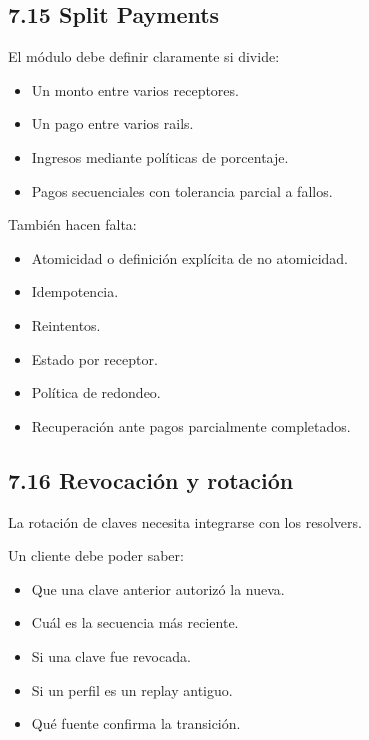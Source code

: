 \documentclass[
]{article}
\providecommand{\tightlist}{%
  \setlength{\itemsep}{0pt}\setlength{\parskip}{0pt}}
\begin{document}
\hypertarget{split-payments}{%
\subsection{7.15 Split Payments}\label{split-payments}}

El módulo debe definir claramente si divide:

\begin{itemize}
\tightlist
\item
  Un monto entre varios receptores.
\item
  Un pago entre varios rails.
\item
  Ingresos mediante políticas de porcentaje.
\item
  Pagos secuenciales con tolerancia parcial a fallos.
\end{itemize}

También hacen falta:

\begin{itemize}
\tightlist
\item
  Atomicidad o definición explícita de no atomicidad.
\item
  Idempotencia.
\item
  Reintentos.
\item
  Estado por receptor.
\item
  Política de redondeo.
\item
  Recuperación ante pagos parcialmente completados.
\end{itemize}

\hypertarget{revocaciuxf3n-y-rotaciuxf3n}{%
\subsection{7.16 Revocación y
rotación}\label{revocaciuxf3n-y-rotaciuxf3n}}

La rotación de claves necesita integrarse con los resolvers.

Un cliente debe poder saber:

\begin{itemize}
\tightlist
\item
  Que una clave anterior autorizó la nueva.
\item
  Cuál es la secuencia más reciente.
\item
  Si una clave fue revocada.
\item
  Si un perfil es un replay antiguo.
\item
  Qué fuente confirma la transición.
\end{itemize}
\end{document}
